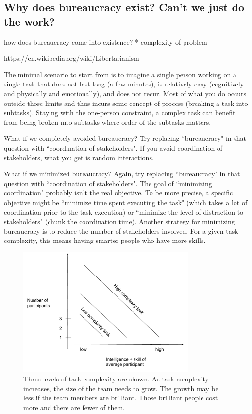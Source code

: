 \subsection{Why does bureaucracy exist? Can't we just do the work?}

how does bureaucracy come into existence?
* complexity of problem


https://en.wikipedia.org/wiki/Libertarianism

The minimal scenario to start from is to imagine a single person working on a single task that does not last long (a few minutes), is relatively easy (cognitively and physically and emotionally), and does not recur. Most of what you do occurs outside those limits and thus incurs some concept of \gls{process} (breaking a task into subtasks). Staying with the one-person constraint, a complex task can benefit from being broken into subtasks where order of the subtasks matters. 





What if we completely avoided bureaucracy? Try replacing ``bureaucracy" in that question with ``coordination of stakeholders". If you avoid coordination of stakeholders, what you get is random interactions. 

What if we minimized bureaucracy? Again, try replacing ``bureaucracy" in that question with ``coordination of stakeholders". The goal of ``minimizing coordination" probably isn't the real objective. To be more precise, a specific objective might be ``minimize time spent executing the task" (which takes a lot of coordination prior to the task execution) or ``minimize the level of distraction to stakeholders" (chunk the coordination time). Another strategy for minimizing bureaucracy is to reduce the number of stakeholders involved. For a given task complexity, this means having smarter people who have more skills. 

\begin{figure}
\includegraphics[width=0.8\textwidth]{images/people-per-task-for-skill-level.pdf}
\caption{Three levels of task complexity are shown. As task complexity increases, the size of the team needs to grow. The growth may be less if the team members are brilliant. Those brilliant people cost more and there are fewer of them.}
\end{figure}
